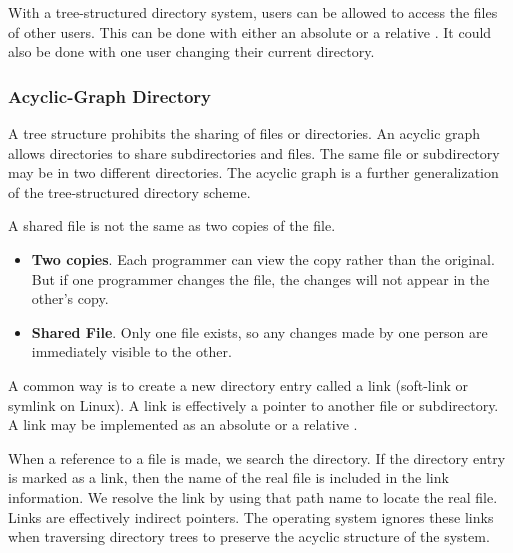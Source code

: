 With a tree-structured directory system, users can be allowed to access the files of other users.
This can be done with either an absolute or a relative .
It could also be done with one user changing their current directory.

\subsubsection{Acyclic-Graph Directory}\label{subsubsec:Acyclic_Graph_Directory}
A tree structure prohibits the sharing of files or directories.
An acyclic graph allows directories to share subdirectories and files.
The same file or subdirectory may be in two different directories.
The acyclic graph is a further generalization of the tree-structured directory scheme.

A shared file is not the same as two copies of the file.
\begin{itemize}[noitemsep]
\item \textbf{Two copies}.
  Each programmer can view the copy rather than the original.
  But if one programmer changes the file, the changes will not appear in the other’s copy.
\item \textbf{Shared File}.
  Only one file exists, so any changes made by one person are immediately visible to the other.
\end{itemize}

A common way is to create a new directory entry called a link (soft-link or symlink on Linux).
A link is effectively a pointer to another file or subdirectory.
A link may be implemented as an absolute or a relative .

When a reference to a file is made, we search the directory.
If the directory entry is marked as a link, then the name of the real file is included in the link information.
We resolve the link by using that path name to locate the real file.
Links are effectively indirect pointers.
The operating system ignores these links when traversing directory trees to preserve the acyclic structure of the system.


